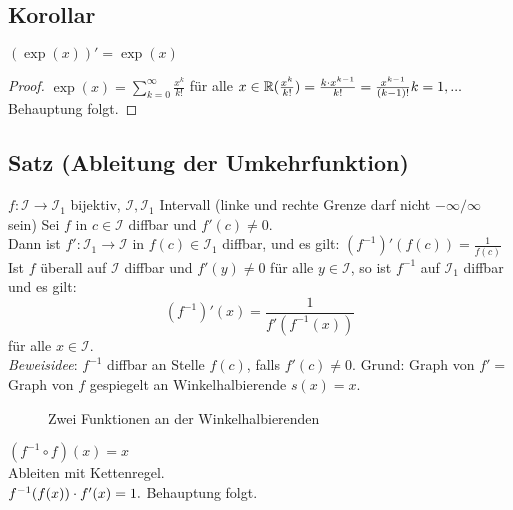 \subsection{Korollar}\label{sec:6.11}
$(\exp(x))' = \exp(x)$
\begin{proof}
$\exp(x) = \sum\limits_{k = 0}^{\infty} \frac{x^k}{k!}$ für alle $x \in \mathbb{R} \\
(\frac{x^k}{k!}) = \frac{k \cdot x^{k-1}}{k!} = \frac{x^{k-1}}{(k-1)!}\\
k = 1, ...$\\
Behauptung folgt.
\end{proof}
\subsection{Satz (Ableitung der Umkehrfunktion)}\label{sec:6.12}
$f: \mathcal{I} \to \mathcal{I}_1$ bijektiv, $\mathcal{I},\mathcal{I}_1$ Intervall (linke und rechte Grenze darf nicht $-\infty/\infty$ sein)
Sei $f$ in $c \in \mathcal{I}$ diffbar und $f'(c) \ne 0$.\\
Dann ist $f': \mathcal{I}_1 \to \mathcal{I}$ in $f(c) \in \mathcal{I}_1$ diffbar, und es gilt: $(f^{-1})' (f(c)) = \frac{1}{f(c)}$\\
Ist $f$ überall auf $\mathcal{I}$ diffbar und $f'(y) \ne 0$ für alle $y \in \mathcal{I}$, so ist $f^{-1}$ auf $\mathcal{I}_1$ diffbar und es gilt: \\
\[(f^{-1})'(x) = \frac{1}{f'(f^{-1}(x))} \] für alle $x \in \mathcal{I}$.\\
\emph{Beweisidee}: $f^{-1}$ diffbar an Stelle $f(c)$, falls $f'(c) \ne 0$. Grund: Graph von $f' =$ Graph von $f$ gespiegelt an Winkelhalbierende $s(x) = x.$\\
\begin{figure}[h!]
\centering
{}
\caption{Zwei Funktionen an der Winkelhalbierenden}
\end{figure}
$(f^{-1} \circ f)(x) =x$\\
Ableiten mit Kettenregel.\\
$f^{-1}(f(x)) \cdot f'(x) = 1.$ Behauptung folgt.
